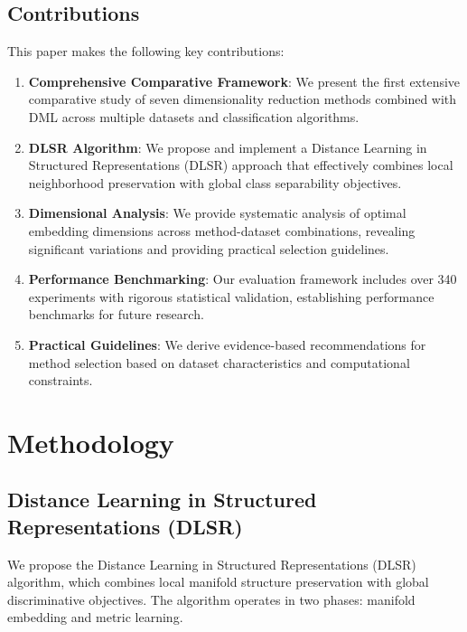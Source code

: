 \documentclass[review]{elsarticle}
\begin{document}
\subsection{Contributions}

This paper makes the following key contributions:

\begin{enumerate}
\item \textbf{Comprehensive Comparative Framework}: We present the first extensive comparative study of seven dimensionality reduction methods combined with DML across multiple datasets and classification algorithms.

\item \textbf{DLSR Algorithm}: We propose and implement a Distance Learning in Structured Representations (DLSR) approach that effectively combines local neighborhood preservation with global class separability objectives.

\item \textbf{Dimensional Analysis}: We provide systematic analysis of optimal embedding dimensions across method-dataset combinations, revealing significant variations and providing practical selection guidelines.

\item \textbf{Performance Benchmarking}: Our evaluation framework includes over 340 experiments with rigorous statistical validation, establishing performance benchmarks for future research.

\item \textbf{Practical Guidelines}: We derive evidence-based recommendations for method selection based on dataset characteristics and computational constraints.
\end{enumerate}

\section{Methodology}
\label{sec:methodology}

\subsection{Distance Learning in Structured Representations (DLSR)}

We propose the Distance Learning in Structured Representations (DLSR) algorithm, which combines local manifold structure preservation with global discriminative objectives. The algorithm operates in two phases: manifold embedding and metric learning.
\end{document}
